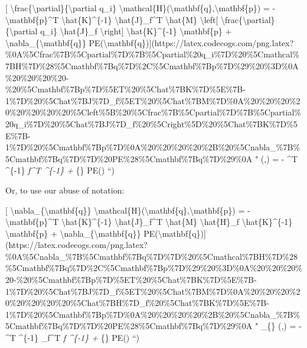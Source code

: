 \documentclass[]{article}
\begin{document}
{[} \textbackslash{}frac\{\textbackslash{}partial\}\{\textbackslash{}partial
q\_i\}
\textbackslash{}mathcal\{H\}(\textbackslash{}mathbf\{q\},\textbackslash{}mathbf\{p\})
= - \textbackslash{}mathbf\{p\}\^{}T \textbackslash{}hat\{K\}\^{}\{-1\}
\textbackslash{}hat\{J\}\_f\^{}T \textbackslash{}hat\{M\}
\textbackslash{}left{[}
\textbackslash{}frac\{\textbackslash{}partial\}\{\textbackslash{}partial q\_i\}
\textbackslash{}hat\{J\}\_f \textbackslash{}right{]}
\textbackslash{}hat\{K\}\^{}\{-1\} \textbackslash{}mathbf\{p\} +
\textbackslash{}nabla\_\{\textbackslash{}mathbf\{q\}\}
PE(\textbackslash{}mathbf\{q\}){]}(https://latex.codecogs.com/png.latex?\%0A\%5Cfrac\%7B\%5Cpartial\%7D\%7B\%5Cpartial\%20q\_i\%7D\%20\%5Cmathcal\%7BH\%7D\%28\%5Cmathbf\%7Bq\%7D\%2C\%5Cmathbf\%7Bp\%7D\%29\%20\%3D\%0A\%20\%20\%20\%20-\%20\%5Cmathbf\%7Bp\%7D\%5ET\%20\%5Chat\%7BK\%7D\%5E\%7B-1\%7D\%20\%5Chat\%7BJ\%7D\_f\%5ET\%20\%5Chat\%7BM\%7D\%0A\%20\%20\%20\%20\%20\%20\%20\%20\%5Cleft\%5B\%20\%5Cfrac\%7B\%5Cpartial\%7D\%7B\%5Cpartial\%20q\_i\%7D\%20\%5Chat\%7BJ\%7D\_f\%20\%5Cright\%5D\%20\%5Chat\%7BK\%7D\%5E\%7B-1\%7D\%20\%5Cmathbf\%7Bp\%7D\%0A\%20\%20\%20\%20\%2B\%20\%5Cnabla\_\%7B\%5Cmathbf\%7Bq\%7D\%7D\%20PE\%28\%5Cmathbf\%7Bq\%7D\%29\%0A
"  (,) = -
\^{}T \^{}\{-1\} \emph{f\^{}T 
 \^{}\{-1\}
 + \nabla}\{\} PE() ``)

Or, to use our abuse of notation:

{[} \textbackslash{}nabla\_\{\textbackslash{}mathbf\{q\}\}
\textbackslash{}mathcal\{H\}(\textbackslash{}mathbf\{q\},\textbackslash{}mathbf\{p\})
= - \textbackslash{}mathbf\{p\}\^{}T \textbackslash{}hat\{K\}\^{}\{-1\}
\textbackslash{}hat\{J\}\_f\^{}T \textbackslash{}hat\{M\}
\textbackslash{}hat\{H\}\_f \textbackslash{}hat\{K\}\^{}\{-1\}
\textbackslash{}mathbf\{p\} +
\textbackslash{}nabla\_\{\textbackslash{}mathbf\{q\}\}
PE(\textbackslash{}mathbf\{q\}){]}(https://latex.codecogs.com/png.latex?\%0A\%5Cnabla\_\%7B\%5Cmathbf\%7Bq\%7D\%7D\%20\%5Cmathcal\%7BH\%7D\%28\%5Cmathbf\%7Bq\%7D\%2C\%5Cmathbf\%7Bp\%7D\%29\%20\%3D\%0A\%20\%20\%20\%20-\%20\%5Cmathbf\%7Bp\%7D\%5ET\%20\%5Chat\%7BK\%7D\%5E\%7B-1\%7D\%20\%5Chat\%7BJ\%7D\_f\%5ET\%20\%5Chat\%7BM\%7D\%0A\%20\%20\%20\%20\%20\%20\%20\%20\%5Chat\%7BH\%7D\_f\%20\%5Chat\%7BK\%7D\%5E\%7B-1\%7D\%20\%5Cmathbf\%7Bp\%7D\%0A\%20\%20\%20\%20\%2B\%20\%5Cnabla\_\%7B\%5Cmathbf\%7Bq\%7D\%7D\%20PE\%28\%5Cmathbf\%7Bq\%7D\%29\%0A
" \nabla\_\{\} (,) = - \^{}T
\^{}\{-1\} \_f\^{}T  \emph{f \^{}\{-1\}
 + \nabla}\{\} PE() ``)
\end{document}
